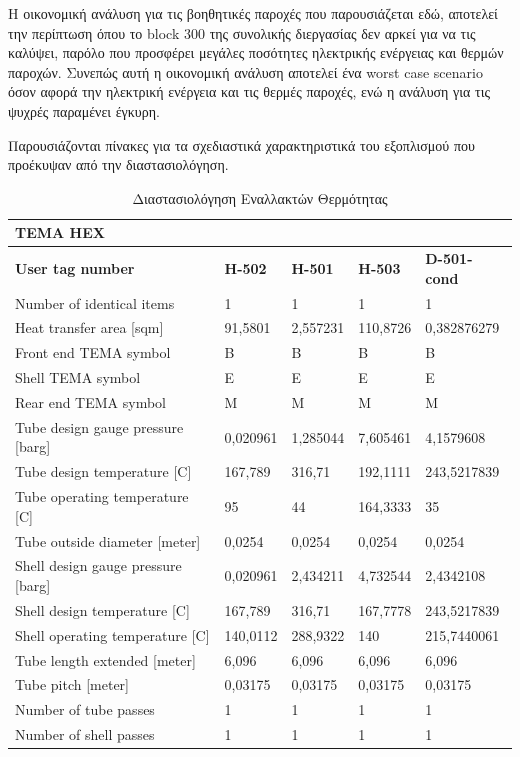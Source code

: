 \documentclass[11pt]{article}
\begin{document}
Η οικονομική ανάλυση για τις βοηθητικές παροχές που παρουσιάζεται εδώ,
αποτελεί την περίπτωση όπου το block 300 της συνολικής διεργασίας δεν αρκεί για να τις
καλύψει, παρόλο που προσφέρει μεγάλες ποσότητες ηλεκτρικής ενέργειας
και θερμών παροχών. Συνεπώς αυτή η οικονομική ανάλυση αποτελεί ένα worst
case scenario όσον αφορά την ηλεκτρική ενέργεια και τις θερμές παροχές,
ενώ η ανάλυση για τις ψυχρές παραμένει έγκυρη.

Παρουσιάζονται πίνακες για τα σχεδιαστικά χαρακτηριστικά του εξοπλισμού
που προέκυψαν από την διαστασιολόγηση.


\begin{table}[htbp]
\caption{Διαστασιολόγηση Εναλλακτών Θερμότητας}
\centering
\begin{tabular}{lllll}
\textbf{TEMA HEX} &  &  &  & \\
\hline
\textbf{User tag number} & \textbf{H-502} & \textbf{H-501} & \textbf{H-503} & \textbf{D-501-cond}\\
Number of identical items & 1 & 1 & 1 & 1\\
Heat transfer area [sqm] & 91,5801 & 2,557231 & 110,8726 & 0,382876279\\
Front end TEMA symbol & B & B & B & B\\
Shell TEMA symbol & E & E & E & E\\
Rear end TEMA symbol & M & M & M & M\\
Tube design gauge pressure [barg] & 0,020961 & 1,285044 & 7,605461 & 4,1579608\\
Tube design temperature [C] & 167,789 & 316,71 & 192,1111 & 243,5217839\\
Tube operating temperature [C] & 95 & 44 & 164,3333 & 35\\
Tube outside diameter [meter] & 0,0254 & 0,0254 & 0,0254 & 0,0254\\
Shell design gauge pressure [barg] & 0,020961 & 2,434211 & 4,732544 & 2,4342108\\
Shell design temperature [C] & 167,789 & 316,71 & 167,7778 & 243,5217839\\
Shell operating temperature [C] & 140,0112 & 288,9322 & 140 & 215,7440061\\
Tube length extended [meter] & 6,096 & 6,096 & 6,096 & 6,096\\
Tube pitch [meter] & 0,03175 & 0,03175 & 0,03175 & 0,03175\\
Number of tube passes & 1 & 1 & 1 & 1\\
Number of shell passes & 1 & 1 & 1 & 1\\
\end{tabular}
\end{table}
\end{document}
